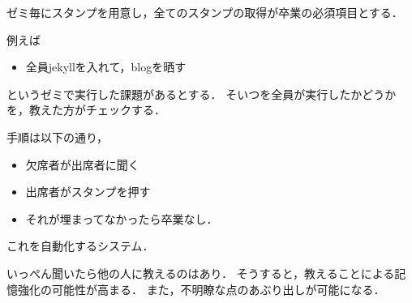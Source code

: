\documentclass{hissymp}
\begin{document}
ゼミ毎にスタンプを用意し，全てのスタンプの取得が卒業の必須項目とする．

例えば
\begin{itemize}
\item 全員jekyllを入れて，blogを晒す
\end{itemize}
というゼミで実行した課題があるとする．
そいつを全員が実行したかどうかを，教えた方がチェックする．

手順は以下の通り，
\begin{itemize}
\item 欠席者が出席者に聞く
\item 出席者がスタンプを押す
\item それが埋まってなかったら卒業なし．
\end{itemize}
これを自動化するシステム．

いっぺん聞いたら他の人に教えるのはあり．
そうすると，教えることによる記憶強化の可能性が高まる．
また，不明瞭な点のあぶり出しが可能になる．
\end{document}
